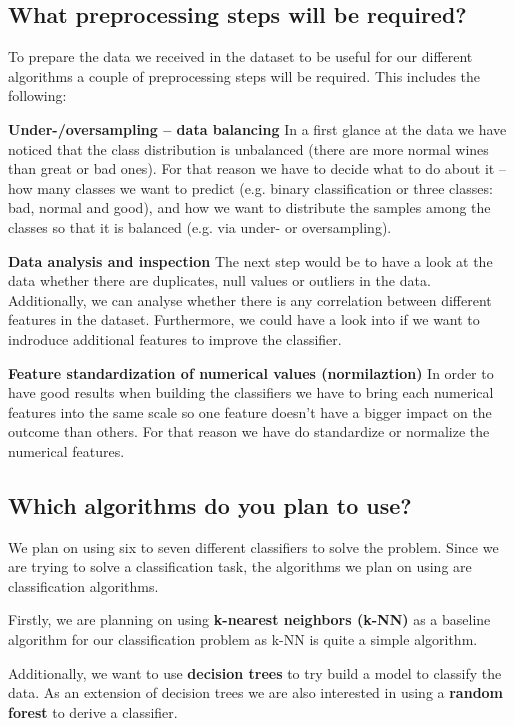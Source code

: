 \documentclass[11pt,titlepage,oneside,openany]{article}
\begin{document}
\subsection{What preprocessing steps will be required?}
To prepare the data we received in the dataset to be useful for our different algorithms a couple of preprocessing
steps will be required. This includes the following:

\textbf{Under-/oversampling -- data balancing} In a first glance at the data we have noticed that the class distribution is
unbalanced (there are more normal wines than great or bad ones). For that reason we have to decide what to do about it -- how many classes we want to predict (e.g. binary classification or three classes: bad, normal and good), and how we want to distribute the samples among the classes so that it is balanced (e.g. via under- or oversampling).

\textbf{Data analysis and inspection} The next step would be to have a look at the data whether there are duplicates, null values or outliers in the data. Additionally, we can analyse whether there is any correlation between different features in the dataset. Furthermore, we could have a look into if we want to indroduce additional features to improve the classifier.

\textbf{Feature standardization of numerical values (normilaztion)} In order to have good results when building the classifiers we have to bring each numerical features into the same scale so one feature doesn't have a bigger impact on the outcome than others. For that reason we have do standardize or normalize the numerical features.

\subsection{Which algorithms do you plan to use?}
We plan on using six to seven different classifiers to solve the problem. Since we 
are trying to solve a classification task, the algorithms we plan on using are classification
algorithms.

Firstly, we are planning on using \textbf{k-nearest neighbors (k-NN)} as a baseline
algorithm for our classification problem as k-NN is quite a simple algorithm.

Additionally, we want to use \textbf{decision trees} to try build a model to classify the
data. As an extension of decision trees we are also interested in using a \textbf{random forest}
to derive a classifier.
\end{document}
